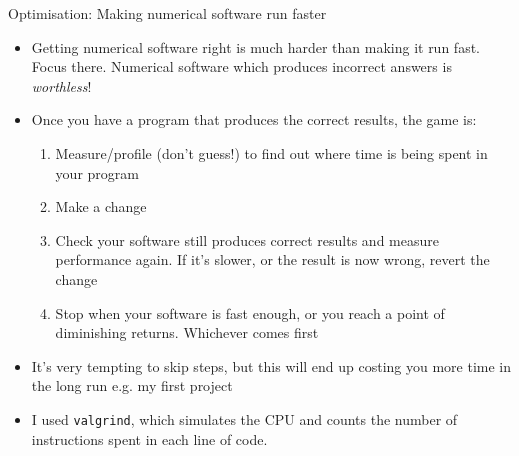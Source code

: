 \documentclass{beamer}
\begin{document}
\begin{frame}{Optimisation: Making numerical software run faster}
\begin{itemize}
\item Getting numerical software right is much harder than making it run fast. Focus there. Numerical software
			which	produces incorrect answers is \emph{worthless}!
\item Once you have a program that produces the correct results, the game is: 
\begin{enumerate}
\item Measure/profile (don't guess!) to find out where time is being spent in your program
\item Make a change
\item Check your software still produces correct results and measure performance again. If it's slower, or the result is now wrong, revert the change
\item Stop when your software is fast enough, or you reach a point of diminishing returns. Whichever comes first
\end{enumerate}
\item It's very tempting to skip steps, but this will end up costing you more time in the long run e.g.
		my first project
\item I used \texttt{valgrind}, which simulates the CPU and counts the number of instructions spent in each
	  line of code. 
\end{itemize}
\end{frame}
\end{document}
